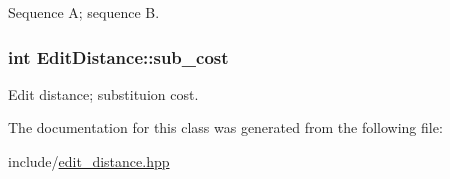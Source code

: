 Sequence A; sequence B. 

\hypertarget{class_edit_distance_a8d220afccf33fade211f6152651f7f27}{
\subsubsection[{sub\+\_\+cost}]{\setlength{\rightskip}{0pt plus 5cm}int Edit\+Distance\+::sub\+\_\+cost\hspace{0.3cm}{\ttfamily [private]}}}\label{class_edit_distance_a8d220afccf33fade211f6152651f7f27}


Edit distance; substituion cost. 



The documentation for this class was generated from the following file\+:\begin{DoxyCompactItemize}
\item 
include/\hyperlink{edit__distance_8hpp}{edit\+\_\+distance.\+hpp}\end{DoxyCompactItemize}

